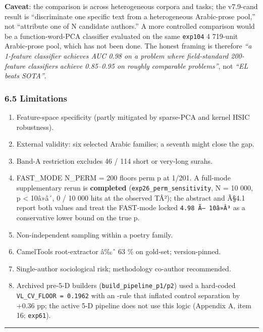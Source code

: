 \documentclass[
]{article}
\providecommand{\tightlist}{%
  \setlength{\itemsep}{0pt}\setlength{\parskip}{0pt}}
\begin{document}
\textbf{Caveat}: the comparison is across heterogeneous corpora and
tasks; the v7.9-cand result is ``discriminate one specific text from a
heterogeneous Arabic-prose pool,'' not ``attribute one of N candidate
authors.'' A more controlled comparison would be a function-word-PCA
classifier evaluated on the same \texttt{exp104} 4 719-unit Arabic-prose
pool, which has not been done. The honest framing is therefore \emph{``a
1-feature classifier achieves AUC 0.98 on a problem where field-standard
200-feature classifiers achieve 0.85--0.95 on roughly comparable
problems''}, not \emph{``EL beats SOTA''}.

\subsubsection{6.5 Limitations}\label{limitations}

\begin{enumerate}
\def\labelenumi{\arabic{enumi}.}
\tightlist
\item
  Feature-space specificity (partly mitigated by sparse-PCA and kernel
  HSIC robustness).
\item
  External validity: six selected Arabic families; a seventh might close
  the gap.
\item
  Band-A restriction excludes 46 / 114 short or very-long surahs.
\item
  FAST\_MODE N\_PERM = 200 floors perm p at 1/201. A full-mode
  supplementary rerun is \textbf{completed}
  (\texttt{exp26\_perm\_sensitivity}, N = 10 000, p \textless{} 10â»â´,
  0 / 10 000 hits at the observed TÂ²); the abstract and Â§4.1 report
  both values and treat the FAST-mode locked \texttt{4.98\ Ã—\ 10â»Â³}
  as a conservative lower bound on the true p.
\item
  Non-independent sampling within a poetry family.
\item
  CamelTools root-extractor â‰ˆ 63 \% on gold-set; version-pinned.
\item
  Single-author sociological risk; methodology co-author recommended.
\item
  Archived pre-5-D builders (\texttt{build\_pipeline\_p1/p2}) used a
  hard-coded \texttt{VL\_CV\_FLOOR\ =\ 0.1962} with an
  \texttt{\textbar{}}-rule that inflated control separation by +0.36 pp;
  the active 5-D pipeline does not use this logic (Appendix A, item 16;
  \texttt{exp61}).
\end{enumerate}

\begin{center}\rule{0.5\linewidth}{0.5pt}\end{center}
\end{document}
